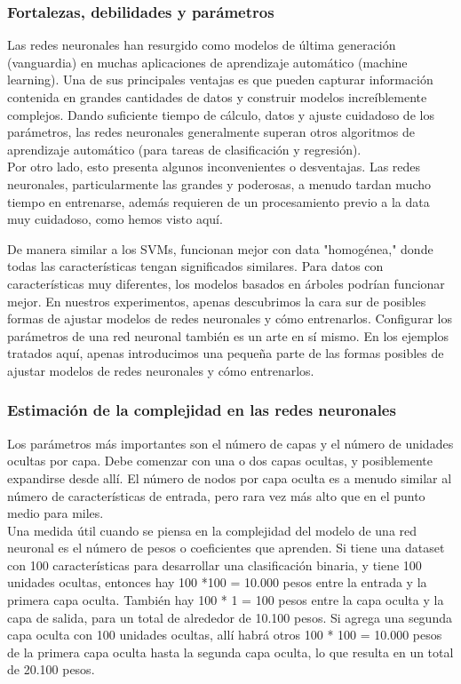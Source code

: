 {\subsubsection{Fortalezas, debilidades y parámetros}



Las redes neuronales han resurgido como modelos de  última generación (vanguardia) en muchas 
aplicaciones de aprendizaje automático (machine learning). Una de sus principales ventajas es que pueden capturar información contenida en grandes cantidades de datos y construir modelos increíblemente complejos.
Dando suficiente tiempo de cálculo, datos y ajuste cuidadoso de los parámetros, las redes neuronales generalmente superan  otros algoritmos de aprendizaje automático (para tareas de clasificación y regresión).\\


Por otro lado, esto presenta algunos  inconvenientes o desventajas.
Las redes neuronales, particularmente las grandes y poderosas, a menudo tardan mucho tiempo en entrenarse, además requieren  de un  procesamiento previo a la data  muy cuidadoso, como hemos visto aquí.

De manera similar a los SVMs, funcionan mejor con data  "{}homogénea{},"{ }  donde todas las características tengan significados similares.  Para datos con  características muy diferentes, los modelos basados en árboles podrían funcionar mejor.  En nuestros experimentos, apenas descubrimos la cara sur de posibles formas de ajustar modelos de redes neuronales y cómo entrenarlos.   Configurar los parámetros de una red neuronal también es un arte en sí mismo. En los ejemplos tratados aquí,  apenas introducimos una pequeña parte de las formas posibles  de ajustar  modelos de redes neuronales y cómo entrenarlos.\\


\subsubsection{Estimación de la complejidad en las redes neuronales}

Los parámetros más importantes son el número de capas y el número de unidades ocultas por capa. Debe comenzar con una o dos capas ocultas, y posiblemente expandirse desde allí.  El número de nodos por capa oculta es a menudo similar al número de características de entrada, pero rara vez más alto que en el punto  medio  para  miles.\\

Una medida útil cuando se piensa en la complejidad del modelo de una red neuronal es el número de pesos o coeficientes que aprenden.  Si tiene una  dataset con  100 características para desarrollar una clasificación  binaria, y tiene 100 unidades ocultas, entonces hay 100 *100 = 10.000 pesos entre la entrada y la primera capa oculta. También hay 100 * 1 = 100  pesos entre la capa oculta y la capa de salida, para un total de alrededor de 10.100 pesos. Si agrega una segunda capa oculta con 100 unidades ocultas, allí
habrá otros 100 * 100 = 10.000 pesos de la primera capa oculta hasta la segunda
capa oculta, lo que resulta en un total de 20.100 pesos. 

}

